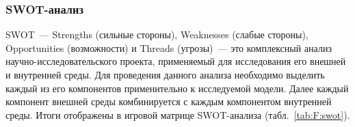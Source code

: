 
\subsubsection{SWOT-анализ}

SWOT~--- Strengths (сильные стороны), Weaknesses (слабые стороны), Opportunities (возможности) и Threads (угрозы)~--- это комплексный анализ научно-исследовательского проекта, применяемый для исследования его внешней и внутренней среды.
Для проведения данного анализа необходимо выделить каждый из его компонентов применительно к исследуемой модели. 
Далее каждый компонент внешней среды комбинируется с каждым компонентом внутренней среды. 
Итоги отображены в игровой матрице SWOT-анализа (табл.~\ref{tab:F:swot}).

